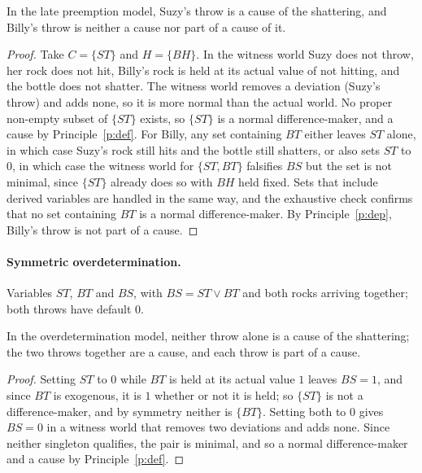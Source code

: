 \documentclass{situationist-preprint}
\begin{document}
\begin{theorem}[Preemption]\label{t:preempt}
In the late preemption model, Suzy's throw is a cause of the shattering, and Billy's throw is neither a cause nor part of a cause of it.
\end{theorem}

\begin{proof}
Take $C = \{\mathit{ST}\}$ and $H = \{\mathit{BH}\}$. In the witness world Suzy does not throw, her rock does not hit, Billy's rock is held at its actual value of not hitting, and the bottle does not shatter. The witness world removes a deviation (Suzy's throw) and adds none, so it is more normal than the actual world. No proper non-empty subset of $\{\mathit{ST}\}$ exists, so $\{\mathit{ST}\}$ is a normal difference-maker, and a cause by Principle~\ref{p:def}. For Billy, any set containing $\mathit{BT}$ either leaves $\mathit{ST}$ alone, in which case Suzy's rock still hits and the bottle still shatters, or also sets $\mathit{ST}$ to $0$, in which case the witness world for $\{\mathit{ST}, \mathit{BT}\}$ falsifies $\mathit{BS}$ but the set is not minimal, since $\{\mathit{ST}\}$ already does so with $\mathit{BH}$ held fixed. Sets that include derived variables are handled in the same way, and the exhaustive check confirms that no set containing $\mathit{BT}$ is a normal difference-maker. By Principle~\ref{p:dep}, Billy's throw is not part of a cause.
\end{proof}

\paragraph{Symmetric overdetermination.} Variables $\mathit{ST}$, $\mathit{BT}$ and $\mathit{BS}$, with $\mathit{BS} = \mathit{ST} \vee \mathit{BT}$ and both rocks arriving together; both throws have default $0$.

\begin{theorem}[Overdetermination]\label{t:over}
In the overdetermination model, neither throw alone is a cause of the shattering; the two throws together are a cause, and each throw is part of a cause.
\end{theorem}

\begin{proof}
Setting $\mathit{ST}$ to $0$ while $\mathit{BT}$ is held at its actual value $1$ leaves $\mathit{BS} = 1$, and since $\mathit{BT}$ is exogenous, it is $1$ whether or not it is held; so $\{\mathit{ST}\}$ is not a difference-maker, and by symmetry neither is $\{\mathit{BT}\}$. Setting both to $0$ gives $\mathit{BS} = 0$ in a witness world that removes two deviations and adds none. Since neither singleton qualifies, the pair is minimal, and so a normal difference-maker and a cause by Principle~\ref{p:def}.
\end{proof}
\end{document}
